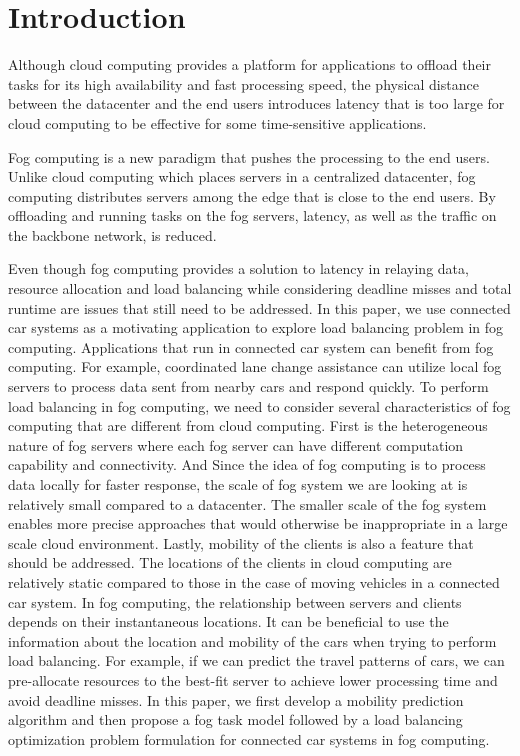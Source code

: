 \section{Introduction}
Although cloud computing provides a platform for applications to offload their tasks for its high availability and fast processing speed, the physical distance between the datacenter and the end users introduces latency that is too large for cloud computing to be effective for some time-sensitive applications.

Fog computing is a new paradigm that pushes the processing to the end users\cite{fogo}. Unlike cloud computing which places servers in a centralized datacenter, fog computing distributes servers among the edge that is close to the end users. By offloading and running tasks on the fog servers, latency, as well as the traffic on the backbone network, is reduced.

Even though fog computing provides a solution to latency in relaying data, resource allocation and load balancing while considering deadline misses and total runtime are issues that still need to be addressed\cite{fogr}. In this paper, we use connected car systems as a motivating application to explore load balancing problem in fog computing. Applications that run in connected car system can benefit from fog computing\cite{fogcar}. For example, coordinated lane change assistance\cite{lc1}\cite{lc2} can utilize local fog servers to process data sent from nearby cars and respond quickly\cite{fogcar}. To perform load balancing in fog computing, we need to consider several characteristics of fog computing that are different from cloud computing. First is the heterogeneous nature of fog servers where each fog server can have different computation capability and connectivity\cite{fogo}. And Since the idea of fog computing is to process data locally for faster response, the scale of fog system we are looking at is relatively small compared to a datacenter. The smaller scale of the fog system enables more precise approaches that would otherwise be inappropriate in a large scale cloud environment. Lastly, mobility of the clients is also a feature that should be addressed. The locations of the clients in cloud computing are relatively static compared to those in the case of moving vehicles in a connected car system. In fog computing, the relationship between servers and clients depends on their instantaneous locations. It can be beneficial to use the information about the location and mobility of the cars when trying to perform load balancing. For example, if we can predict the travel patterns of cars, we can pre-allocate resources to the best-fit server to achieve lower processing time and avoid deadline misses. In this paper, we first develop a mobility prediction algorithm and then propose a fog task model followed by a load balancing optimization problem formulation for connected car systems in fog computing.

